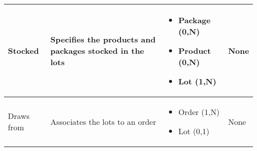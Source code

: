\begin{longtable}{|p{}|p{} |p{}|p{} |}
Stocked  & Specifies the products and packages stocked in the lots & \begin{itemize}
	\vspace{-1em}
	\item Package (0,N)
	\item Product (0,N)
	\item Lot (1,N)
\end{itemize}
&  None \\\hline


Draws from & Associates the lots to an order & \begin{itemize}
	\vspace{-1em}
	\item Order (1,N)
	\item Lot (0,1)
\end{itemize}
&  None \\\hline

\end{longtable}